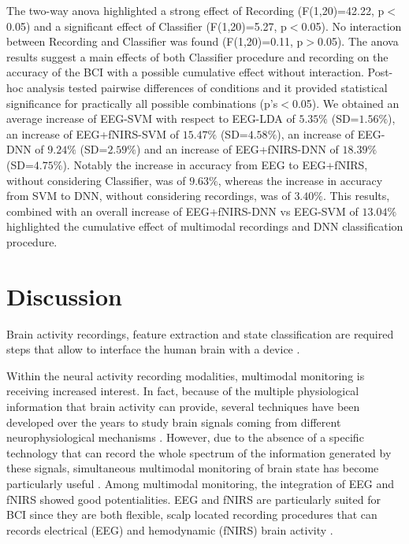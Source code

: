 \documentclass[12pt ]{iopart}
\begin{document}
The two-way anova highlighted a strong effect of Recording (F(1,20)=42.22, p$<$0.05) and a significant effect of Classifier (F(1,20)=5.27, p$<$0.05). No interaction between Recording and Classifier was found (F(1,20)=0.11, p$>$0.05). The anova results suggest a main effects of both Classifier procedure and recording on the accuracy of the BCI with a possible cumulative effect without interaction.
Post-hoc analysis tested pairwise differences  of conditions and it provided statistical significance for practically  all possible combinations (p's$<$0.05).
We obtained an average increase of EEG-SVM with respect to EEG-LDA of $5.35\%$ (SD=$1.56\%$), an increase of EEG+fNIRS-SVM of $15.47\%$ (SD=$4.58\%$), an increase of EEG-DNN of $9.24\%$ (SD=$2.59\%$) and an increase of EEG+fNIRS-DNN of $18.39\%$ (SD=$4.75\%$). Notably the increase in accuracy from EEG to EEG+fNIRS, without considering Classifier, was of $9.63\%$, whereas the increase in accuracy from SVM to DNN, without considering recordings, was of  $3.40\%$. This results, combined with an overall increase of EEG+fNIRS-DNN vs EEG-SVM of  $13.04\%$ highlighted the cumulative effect of multimodal recordings and DNN classification procedure.

\section{Discussion}
 Brain activity recordings, feature extraction and state classification are required steps that allow to interface the human brain with a device \parencite{wolpaw2000brain}. 
 
	 Within the neural activity recording modalities, multimodal monitoring is receiving increased interest.  In fact, because of the multiple physiological information that brain activity can provide, several techniques have been developed over the years to study brain signals coming from different neurophysiological mechanisms \parencite{pfurtscheller2010hybrid,fazli2012enhanced,khan2014decoding,hong2015classification,croce2016eeg}. However, due to the absence of a specific technology that can record the whole spectrum of the information generated by these signals, simultaneous multimodal monitoring of brain state has become particularly useful . Among multimodal monitoring, the integration  of EEG and  fNIRS showed good potentialities. EEG and fNIRS are particularly suited for BCI since they are both flexible, scalp located recording procedures that can records  electrical  (EEG) and hemodynamic (fNIRS) brain activity \parencite{chiarelliREVdaaggiungere} . 
 
\end{document}

